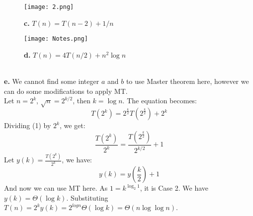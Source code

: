 \documentclass{article}
\theoremstyle{plain}
\begin{document}
    \begin{figure}
    \centering
    \texttt{[image: 2.png]}
    \caption{\textbf{c.} $T(n) = T(n - 2) + 1/n$}
    \label{fig:example}
    \end{figure}

    \begin{figure}
    \centering
    \texttt{[image: Notes.png]}
    \caption{\textbf{d.} $T(n) = 4T(n/2) + n^2 \log n$}
    \label{fig:example}
    \end{figure}
\pagebreak
\textbf{\\e.} We cannot find some integer $a$ and $b$ to use Master theorem here, however we can do some modifications to apply MT.\\
Let $n = 2^k$, $\sqrt{n} = 2^{k/2}$, then $k = \log n$. The equation becomes:
\begin{equation}
T(2^k) = 2^{\frac{k}{2}} T(2^{\frac{k}{2}}) + 2^{k}
\tag{1}
\end{equation}
Dividing (1) by $2^k$, we get:
\begin{equation}
\frac{T(2^k)}{2^k} = \frac{T(2^{\frac{k}{2}})}{2^{k/2}} + 1
\tag{2}
\end{equation}
Let $y(k) = \frac{T(2^k)}{2^k}$, we have:
\begin{equation}
y(k) = y(\frac{k}{2}) + 1
\tag{3}
\end{equation}
And now we can use MT here. As $1 = k^{\log_2 1}$, it is Case 2. We have $y(k) = \Theta(\log k)$. Substituting $T(n) = 2^k y(k) = 2^{log n} \Theta(\log k) = \Theta(n \log \log n)$.
\end{document}
